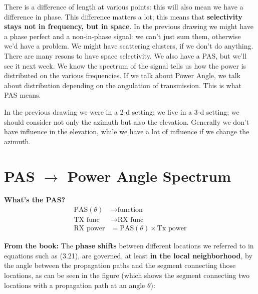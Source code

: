 \documentclass[a4paper, 12pt]{book}
\begin{document}
\begin{center}
\end{center}

There is a difference of length at various points: this will also mean we have a difference in phase.
This difference matters a lot; this means that \textbf{selectivity stays not in frequency, but in space}.
In the previous drawing we might have a phase perfect and a non-in-phase signal: we can't just sum them, otherwise we'd have a problem.
We might have scattering clusters, if we don't do anything.
There are many resons to have space selectivity. We also have a PAS, but we'll see it next week.
We know the spectrum of the signal tells us how the power is distributed on the various frequencies.
If we talk about Power Angle, we talk about distribution depending on the angulation of transmission. This is what PAS means.

In the previous drawing we were in a 2-d setting; we live in a 3-d setting; we should consider not only the azimuth but also the elevation.
Generally we don't have influence in the elevation, while we have a lot of influence if we change the azimuth.

\newpage

\section{PAS $\to$ Power Angle Spectrum}

\textbf{What's the PAS?}
\begin{align*}
\text{PAS}(\theta) &\to \text{function} \\
\text{TX func} &\to \text{RX func} \\
\text{RX power} &= \text{PAS}(\theta) \times \text{Tx power}
\end{align*}

\begin{greenbar}
\textbf{From the book:}
The \textbf{phase shifts} between different locations we referred to in equations such as (3.21), are governed, at least \textbf{in the local neighborhood}, by the angle between the propagation paths and the segment connecting those locations, as can be seen in the figure (which shows the segment connecting two locations with a propagation path at an angle $\theta$):
\end{greenbar}
\end{document}
